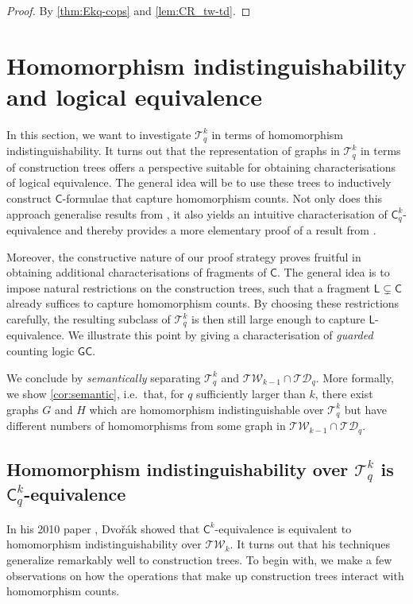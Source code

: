 \documentclass{lmcs}
\theoremstyle{plain}\newtheorem{claim}[thm]{Claim}   %
\newcommand{\cT}{\ensuremath{\mathcal T}}
\newcommand{\TW}{\ensuremath{\mathcal{TW}}}
\newcommand{\Ekq}{\ensuremath{\cT_{q}^{k}}}
\newcommand{\lC} {\ensuremath{\mathsf C}}
\newcommand{\lL} {\ensuremath{\mathsf L}}
\newcommand{\lGC}{\ensuremath{\mathsf{GC}}}
\begin{document}
\begin{proof}
	By \autoref{thm:Ekq-cops} and \autoref{lem:CR_tw-td}.
\end{proof}

\section{Homomorphism indistinguishability and logical equivalence}
\label{sec:deep-wide-homind}

In this section, we want to investigate $\Ekq$ in terms of homomorphism indistinguishability.
It turns out that the representation of graphs in $\Ekq$ in terms of construction trees offers a perspective suitable for obtaining characterisations of logical equivalence.
The general idea will be to use these trees to inductively construct $\lC$-formulae that capture homomorphism counts.
Not only does this approach generalise results from \cite{Dvorak_recognizing_2010,Grohe_counting_2020}, it also yields an intuitive characterisation of $\lC^k_q$-equivalence and thereby provides a more elementary proof of a result from \cite{dawar_lovasz-type_2021}.

Moreover, the constructive nature of our proof strategy proves fruitful in obtaining additional characterisations of fragments of $\lC$.
The general idea is to impose natural restrictions on the construction trees, such that a fragment $\lL \subsetneq \lC$ already suffices to capture homomorphism counts.
By choosing these restrictions carefully, the resulting subclass of $\Ekq$ is then still large enough to capture $\lL$-equivalence.
We illustrate this point by giving a characterisation of \emph{guarded} counting logic $\lGC$.

We conclude by \emph{semantically} separating $\Ekq$ and $\mathcal{TW}_{k-1} \cap \mathcal{TD}_q$.
More formally, we show \autoref{cor:semantic}, i.e.\ that, for $q$ sufficiently larger than $k$, there exist graphs $G$ and $H$ which are homomorphism indistinguishable over $\Ekq$ but have different numbers of homomorphisms from some graph in $\mathcal{TW}_{k-1} \cap \mathcal{TD}_q$.

\subsection{Homomorphism indistinguishability over \texorpdfstring{$\Ekq$}{Ekq} is \texorpdfstring{$\lC^k_q$}{Ckq}-equivalence}
\label{subsec:ckq}

In his 2010 paper \cite{Dvorak_recognizing_2010}, Dvo\v{r}ák showed that $\lC^k$-equivalence is equivalent to homomorphism indistinguishability over $\TW_k$.
It turns out that his techniques generalize remarkably well to construction trees.
To begin with, we make a few observations on how the operations that make up construction trees interact with homomorphism counts.
\end{document}
